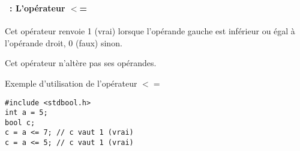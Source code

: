 \begin{frame}[containsverbatim]
  \frametitle{\secname}
  \framesubtitle{\subsecname~: L'opérateur $<$=} 

  Cet opérateur renvoie 1 (vrai) lorsque l'opérande gauche est inférieur ou égal à l'opérande droit, 0 (faux) sinon. 
  \par
  Cet opérateur n'altère pas ses opérandes.
  \vspace{0.3cm}
  \begin{exampleblock}{Exemple d'utilisation de l'opérateur $<=$}
    \begin{verbatim}
#include <stdbool.h>
int a = 5;
bool c;
c = a <= 7; // c vaut 1 (vrai)
c = a <= 5; // c vaut 1 (vrai)\end{verbatim}
  \end{exampleblock}
\end{frame}

